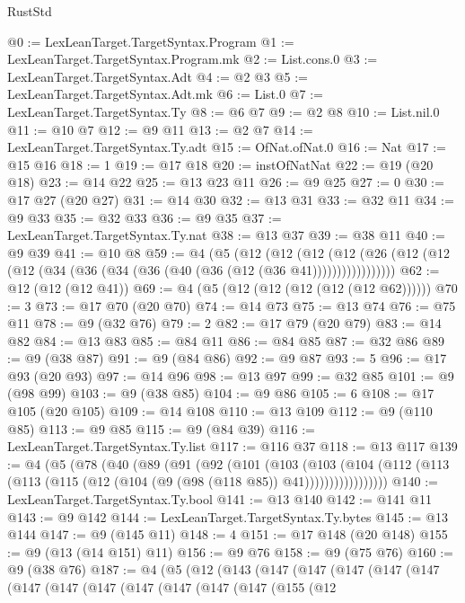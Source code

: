 \begin{lexlean}{RustStd}
\begin{coremodule}
{\begin{coremodule}
{{{{{{{{{{{{{{{{{{{{{{{{{{{{{{{{{{{{{{{{{{{{{{{{{{@0 := LexLeanTarget.TargetSyntax.Program
@1 := LexLeanTarget.TargetSyntax.Program.mk
@2 := List.cons.{0}
@3 := LexLeanTarget.TargetSyntax.Adt
@4 := @2 @3
@5 := LexLeanTarget.TargetSyntax.Adt.mk
@6 := List.{0}
@7 := LexLeanTarget.TargetSyntax.Ty
@8 := @6 @7
@9 := @2 @8
@10 := List.nil.{0}
@11 := @10 @7
@12 := @9 @11
@13 := @2 @7
@14 := LexLeanTarget.TargetSyntax.Ty.adt
@15 := OfNat.ofNat.{0}
@16 := Nat
@17 := @15 @16
@18 := 1
@19 := @17 @18
@20 := instOfNatNat
@22 := @19 (@20 @18)
@23 := @14 @22
@25 := @13 @23 @11
@26 := @9 @25
@27 := 0
@30 := @17 @27 (@20 @27)
@31 := @14 @30
@32 := @13 @31
@33 := @32 @11
@34 := @9 @33
@35 := @32 @33
@36 := @9 @35
@37 := LexLeanTarget.TargetSyntax.Ty.nat
@38 := @13 @37
@39 := @38 @11
@40 := @9 @39
@41 := @10 @8
@59 := @4
    (@5
      (@12
        (@12
          (@12 (@12 (@26 (@12 (@12 (@12 (@34 (@36 (@34 (@36 (@40 (@36 (@12 (@36 @41)))))))))))))))))
@62 := @12 (@12 (@12 @41))
@69 := @4 (@5 (@12 (@12 (@12 (@12 (@12 @62))))))
@70 := 3
@73 := @17 @70 (@20 @70)
@74 := @14 @73
@75 := @13 @74
@76 := @75 @11
@78 := @9 (@32 @76)
@79 := 2
@82 := @17 @79 (@20 @79)
@83 := @14 @82
@84 := @13 @83
@85 := @84 @11
@86 := @84 @85
@87 := @32 @86
@89 := @9 (@38 @87)
@91 := @9 (@84 @86)
@92 := @9 @87
@93 := 5
@96 := @17 @93 (@20 @93)
@97 := @14 @96
@98 := @13 @97
@99 := @32 @85
@101 := @9 (@98 @99)
@103 := @9 (@38 @85)
@104 := @9 @86
@105 := 6
@108 := @17 @105 (@20 @105)
@109 := @14 @108
@110 := @13 @109
@112 := @9 (@110 @85)
@113 := @9 @85
@115 := @9 (@84 @39)
@116 := LexLeanTarget.TargetSyntax.Ty.list
@117 := @116 @37
@118 := @13 @117
@139 := @4
    (@5
      (@78
        (@40
          (@89
            (@91
              (@92
                (@101
                  (@103
                    (@103
                      (@104
                        (@112 (@113 (@113 (@115 (@12 (@104 (@9 (@98 (@118 @85)) @41)))))))))))))))))
@140 := LexLeanTarget.TargetSyntax.Ty.bool
@141 := @13 @140
@142 := @141 @11
@143 := @9 @142
@144 := LexLeanTarget.TargetSyntax.Ty.bytes
@145 := @13 @144
@147 := @9 (@145 @11)
@148 := 4
@151 := @17 @148 (@20 @148)
@155 := @9 (@13 (@14 @151) @11)
@156 := @9 @76
@158 := @9 (@75 @76)
@160 := @9 (@38 @76)
@187 := @4
    (@5
      (@12
        (@143
          (@147
            (@147
              (@147
                (@147
                  (@147
                    (@147
                      (@147
                        (@147
                          (@147
                            (@147
                              (@147
                                (@147
                                  (@155
                                    (@12
}}}}}}}}}}}}}}}}}}}}}}}}}}}}}}}}}}}}}}}}}}}}}}}}}}
\end{coremodule}}
\end{coremodule}
\end{lexlean}
